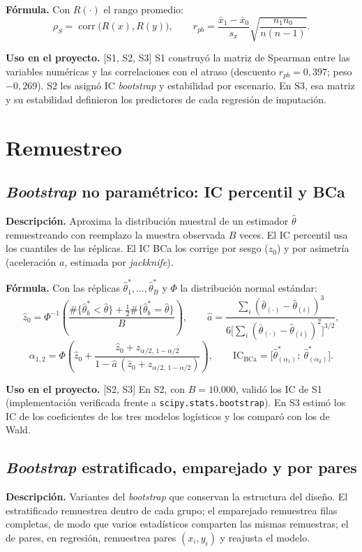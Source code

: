 \documentclass[11pt,a4paper]{article}
\newcommand{\codigo}[1]{{\small\texttt{#1}}}
\newcommand{\desc}{\textbf{Descripción.} }
\newcommand{\formula}{\textbf{Fórmula.} }
\newcommand{\uso}{\textbf{Uso en el proyecto.} }
\newcommand{\fase}[1]{{\footnotesize\color{gris}[#1]}}
\begin{document}
\formula Con $R(\cdot)$ el rango promedio:
\[
\rho_S=\operatorname{corr}\big(R(x),R(y)\big),\qquad
r_{pb}=\frac{\bar x_1-\bar x_0}{s_x}\sqrt{\frac{n_1n_0}{n(n-1)}} .
\]

\uso \fase{S1, S2, S3} S1 construyó la matriz de Spearman entre las variables numéricas y las correlaciones con el atraso (descuento $r_{pb}=0{,}397$; peso $-0{,}269$). S2 les asignó IC \emph{bootstrap} y estabilidad por escenario. En S3, esa matriz y su estabilidad definieron los predictores de cada regresión de imputación.

\section{Remuestreo}\label{sec:remuestreo}

\subsection{\emph{Bootstrap} no paramétrico: IC percentil y BCa}
\desc Aproxima la distribución muestral de un estimador $\hat\theta$ remuestreando con reemplazo la muestra observada $B$ veces. El IC percentil usa los cuantiles de las réplicas. El IC BCa los corrige por sesgo ($z_0$) y por asimetría (aceleración $a$, estimada por \emph{jackknife}).

\formula Con las réplicas $\hat\theta^*_1,\dots,\hat\theta^*_B$ y $\Phi$ la distribución normal estándar:
\[
\hat z_0=\Phi^{-1}\!\left(\frac{\#\{\hat\theta^*_b<\hat\theta\}+\tfrac12\#\{\hat\theta^*_b=\hat\theta\}}{B}\right),\qquad
\hat a=\frac{\sum_i(\bar\theta_{(\cdot)}-\hat\theta_{(i)})^3}{6\big[\sum_i(\bar\theta_{(\cdot)}-\hat\theta_{(i)})^2\big]^{3/2}},
\]
\[
\alpha_{1,2}=\Phi\!\left(\hat z_0+\frac{\hat z_0+z_{\alpha/2,\,1-\alpha/2}}{1-\hat a\,(\hat z_0+z_{\alpha/2,\,1-\alpha/2})}\right),\qquad
\text{IC}_{\text{BCa}}=\big[\hat\theta^*_{(\alpha_1)};\ \hat\theta^*_{(\alpha_2)}\big].
\]

\uso \fase{S2, S3} En S2, con $B=10.000$, validó los IC de S1 (implementación verificada frente a \codigo{scipy.stats.bootstrap}). En S3 estimó los IC de los coeficientes de los tres modelos logísticos y los comparó con los de Wald.

\subsection{\emph{Bootstrap} estratificado, emparejado y por pares}
\desc Variantes del \emph{bootstrap} que conservan la estructura del diseño. El estratificado remuestrea dentro de cada grupo; el emparejado remuestrea filas completas, de modo que varios estadísticos comparten las mismas remuestras; el de pares, en regresión, remuestrea pares $(x_i,y_i)$ y reajusta el modelo.
\end{document}
